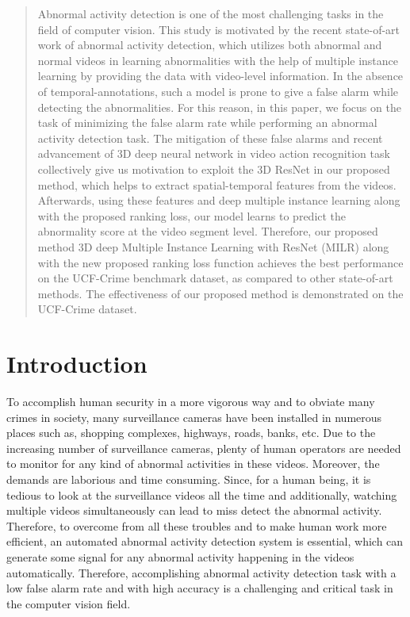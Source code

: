 \documentclass[conference]{IEEEtran}
\begin{document}
\begin{abstract}
Abnormal activity detection is one of the most challenging tasks in the field of computer vision. This study is motivated by the recent state-of-art work of abnormal activity detection, which utilizes both abnormal and normal videos in learning abnormalities with the help of multiple instance learning by providing the data with video-level information. In the absence of temporal-annotations, such a model is prone to give a false alarm while detecting the abnormalities. For this reason, in this paper, we focus on the task of minimizing the false alarm rate while performing an abnormal activity detection task. The mitigation of these false alarms and recent advancement of 3D deep neural network in video action recognition task collectively give us motivation to exploit the 3D ResNet in our proposed method, which helps to extract spatial-temporal features from the videos. Afterwards, using these features and deep multiple instance learning along with the proposed ranking loss, our model learns to predict the abnormality score at the video segment level. Therefore, our proposed method 3D deep Multiple Instance Learning with ResNet (MILR) along with the new proposed ranking loss function achieves the best performance on the UCF-Crime benchmark dataset, as compared to other state-of-art methods. The effectiveness of our proposed method is demonstrated on the UCF-Crime dataset.    
\end{abstract}




\IEEEpeerreviewmaketitle



\section{Introduction}
To accomplish human security in a more vigorous way and to obviate many crimes in society, many surveillance cameras have been installed in numerous places such as, shopping complexes, highways, roads, banks, etc. Due to the increasing number of surveillance cameras, plenty of human operators are needed to monitor for any kind of abnormal activities in these videos. Moreover, the demands are laborious and time consuming. Since, for a human being, it is tedious to look at the surveillance videos all the time and additionally, watching multiple videos simultaneously can lead to miss detect the abnormal activity. Therefore, to overcome from all these troubles and to make human work more efficient, an automated abnormal activity detection system is essential, which can generate some signal for any abnormal activity happening in the videos automatically. Therefore, accomplishing abnormal activity detection task with a low false alarm rate and with high accuracy is a challenging and critical task in the computer vision field.
\end{document}
